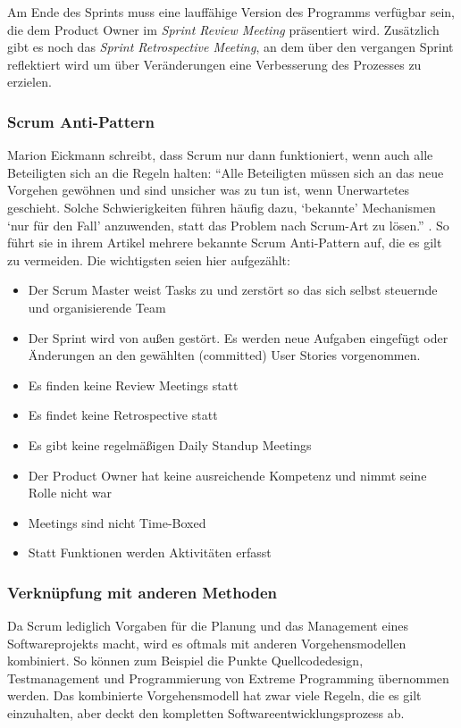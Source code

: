 Am Ende des Sprints muss eine lauffähige Version des Programms verfügbar sein, die dem Product Owner im \emph{Sprint Review Meeting} präsentiert wird. Zu\-sätz\-lich gibt es noch das \emph{Sprint Retrospective Meeting}, an dem über den vergangen Sprint reflektiert wird um über Veränderungen eine Verbesserung des Prozesses zu erzielen.

\subsubsection{Scrum Anti-Pattern}
Marion Eickmann schreibt, dass Scrum nur dann funktioniert, wenn auch alle Beteiligten sich an die Regeln halten: ``Alle Beteiligten müssen sich an das neue Vorgehen gewöhnen und sind unsicher was zu tun ist, wenn Unerwartetes geschieht. Solche Schwierigkeiten führen häufig dazu, `bekannte' Mechanismen `nur für den Fall' anzuwenden, statt das Problem nach Scrum-Art zu lösen.'' \cite[S. 84]{bib:ix2010}. So führt sie in ihrem Artikel mehrere bekannte Scrum Anti-Pattern auf, die es gilt zu vermeiden. Die wichtigsten seien hier aufgezählt:
\begin{itemize}
  \item Der Scrum Master weist Tasks zu und zerstört so das sich selbst steuernde und organisierende Team
  \item Der Sprint wird von außen gestört. Es werden neue Aufgaben eingefügt oder Änderungen an den gewählten (committed) User Stories vorgenommen.
  \item Es finden keine Review Meetings statt
  \item Es findet keine Retrospective statt
  \item Es gibt keine regelmäßigen Daily Standup Meetings
  \item Der Product Owner hat keine ausreichende Kompetenz und nimmt seine Rolle nicht war
  \item Meetings sind nicht Time-Boxed
  \item Statt Funktionen werden Aktivitäten erfasst
\end{itemize} 

\subsubsection{Verknüpfung mit anderen Methoden}
Da Scrum lediglich Vorgaben für die Planung und das Management eines Softwareprojekts macht, wird es oftmals mit anderen Vorgehensmodellen kombiniert. So können zum Beispiel die Punkte Quellcodedesign, Testmanagement und Programmierung von Extreme Programming übernommen werden. Das kombinierte Vorgehensmodell hat zwar viele Regeln, die es gilt einzuhalten, aber deckt den kompletten Softwareentwicklungsprozess ab.

